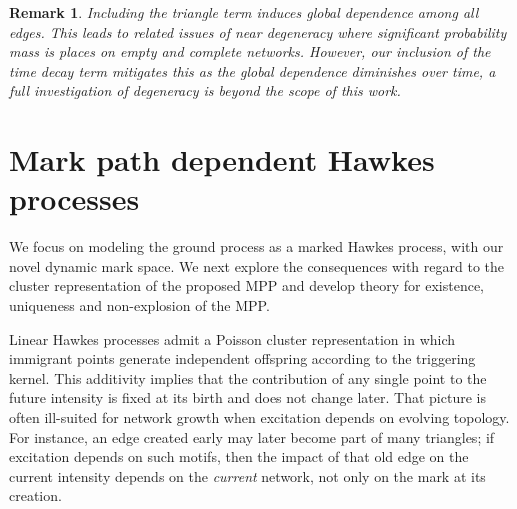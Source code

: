 \documentclass[12pt]{article}
\newtheorem{remark}[theorem]{Remark}
\begin{document}
\begin{remark}
    Including the triangle term induces global dependence among all edges. This leads to related issues of near degeneracy \citep{handcock2003} where significant probability mass is places on empty and complete networks. However, our inclusion of the time decay term mitigates this as the global dependence diminishes over time, a full investigation of degeneracy is beyond the scope of this work.
\end{remark}

\section{Mark path dependent Hawkes processes}\label{sec:path_dependent}

We focus on modeling the ground process as a marked Hawkes process, with our novel dynamic mark space. We next explore the consequences with regard to the cluster representation of the proposed MPP and develop theory for existence, uniqueness and non-explosion of the MPP. 

Linear Hawkes processes admit a Poisson cluster representation \citep{hawkes1974cluster} in which immigrant points generate independent offspring according to the triggering kernel. This additivity implies that the contribution of any single point to the future intensity is fixed at its birth and does not change later. That picture is often ill-suited for network growth when excitation depends on evolving topology. For instance, an edge created early may later become part of many triangles; if excitation depends on such motifs, then the impact of that old edge on the current intensity depends on the \emph{current} network, not only on the mark at its creation.
\end{document}
